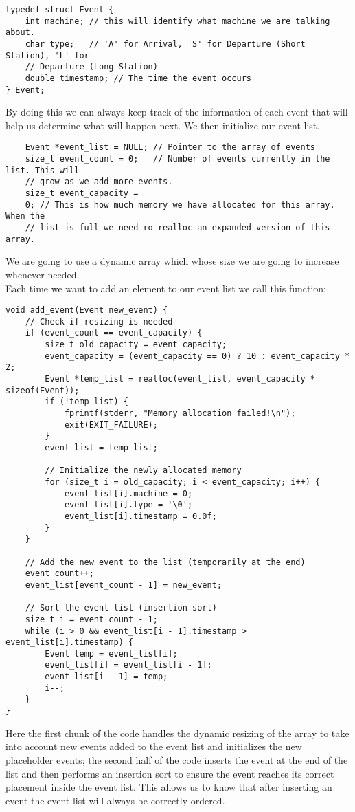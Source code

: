 \documentclass[12pt]{article}
\begin{document}
\begin{lstlisting}
typedef struct Event {
	int machine; // this will identify what machine we are talking about.
	char type;   // 'A' for Arrival, 'S' for Departure (Short Station), 'L' for
	// Departure (Long Station)
	double timestamp; // The time the event occurs
} Event;
\end{lstlisting}
By doing this we can always keep track of the information of each event that will help us determine what will happen next. We then initialize our event list.
\begin{lstlisting}
	Event *event_list = NULL; // Pointer to the array of events
	size_t event_count = 0;   // Number of events currently in the list. This will
	// grow as we add more events.
	size_t event_capacity =
	0; // This is how much memory we have allocated for this array. When the
	// list is full we need ro realloc an expanded version of this array.
\end{lstlisting}
We are going to use a dynamic array which whose size we are going to increase whenever needed. \\
Each time we want to add an element to our event list we call this function:
\begin{lstlisting}
void add_event(Event new_event) {
	// Check if resizing is needed
	if (event_count == event_capacity) {
		size_t old_capacity = event_capacity;
		event_capacity = (event_capacity == 0) ? 10 : event_capacity * 2;
		Event *temp_list = realloc(event_list, event_capacity * sizeof(Event));
		if (!temp_list) {
			fprintf(stderr, "Memory allocation failed!\n");
			exit(EXIT_FAILURE);
		}
		event_list = temp_list;
		
		// Initialize the newly allocated memory
		for (size_t i = old_capacity; i < event_capacity; i++) {
			event_list[i].machine = 0;
			event_list[i].type = '\0';
			event_list[i].timestamp = 0.0f;
		}
	}
	
	// Add the new event to the list (temporarily at the end)
	event_count++;
	event_list[event_count - 1] = new_event;
	
	// Sort the event list (insertion sort)
	size_t i = event_count - 1;
	while (i > 0 && event_list[i - 1].timestamp > event_list[i].timestamp) {
		Event temp = event_list[i];
		event_list[i] = event_list[i - 1];
		event_list[i - 1] = temp;
		i--;
	}
}
\end{lstlisting}
Here the first chunk of the code handles the dynamic resizing of the array to take into account new events added to the event list and initializes the new placeholder events; the second half of the code inserts the event at the end of the list and then performs an insertion sort to ensure the event reaches its correct placement inside the event list. This allows us to know that after inserting an event the event list will always be correctly ordered. \par
\end{document}
